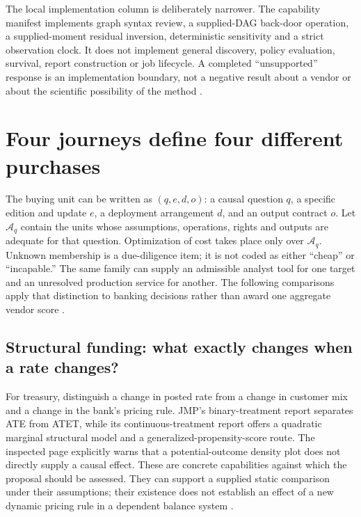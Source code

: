 The local implementation column is deliberately narrower. The capability
manifest implements graph syntax review, a supplied-DAG back-door operation,
a supplied-moment residual inversion, deterministic sensitivity and a strict
observation clock. It does not implement general discovery, policy evaluation,
survival, report construction or job lifecycle. A completed ``unsupported''
response is an implementation boundary, not a negative result about a vendor
or about the scientific possibility of the method
\citep{exec16_commercial_runtime,exec16_commercial_matrix}.

\section{Four journeys define four different purchases}
\label{exec17:s8-journeys}

The buying unit can be written as $(q,e,d,o)$: a causal question $q$, a
specific edition and update $e$, a deployment arrangement $d$, and an output
contract $o$. Let $\mathcal A_q$ contain the units whose assumptions, operations,
rights and outputs are adequate for that question. Optimization of cost takes
place only over $\mathcal A_q$. Unknown membership is a due-diligence item;
it is not coded as either ``cheap'' or ``incapable.'' The same family can
supply an admissible analyst tool for one target and an unresolved production
service for another. The following comparisons apply that distinction to
banking decisions rather than award one aggregate vendor score
\citep{exec17_s8_paths}.

\subsection{Structural funding: what exactly changes when a rate changes?}

For treasury, distinguish a change in posted rate from a change in customer
mix and a change in the bank's pricing rule. JMP's binary-treatment report
separates ATE from ATET, while its continuous-treatment report offers a
quadratic marginal structural model and a generalized-propensity-score route.
The inspected page explicitly warns that a potential-outcome density plot
does not directly supply a causal effect. These are concrete capabilities
against which the proposal should be assessed. They can support a supplied
static comparison under their assumptions; their existence does not establish
an effect of a new dynamic pricing rule in a dependent balance system
\citep{exec13_ch_jmp_causal}.

